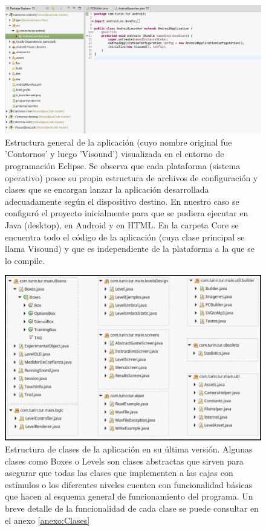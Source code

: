 \documentclass{article}
\numberwithin{figure}{section}
\begin{document}
    \begin{figure}
        \center
        \includegraphics[width=\textwidth]{Imagenes/Eclipse1.png}
        \caption{Estructura general de la aplicación (cuyo nombre original fue 'Contornos' y luego 'Visound') visualizada en el entorno de programación Eclipse. Se observa que cada plataforma (sistema operativo) posee su propia estructura de archivos de configuración y clases que se encargan lanzar la aplicación desarrollada adecuadamente según el dispositivo destino. En nuestro caso se configuró el proyecto inicialmente para que se pudiera ejecutar en Java (desktop), en Android y en HTML. En la carpeta Core se encuentra todo el código de la aplicación (cuya clase principal se llama Visound) y que es independiente de la plataforma a la que se lo compile.}
        \label{fig:Eclipse1}
    \end{figure}
    
    \begin{figure}
        \center
        \includegraphics[width=\textwidth]{Imagenes/Clases.png}
        \caption{Estructura de clases de la aplicación en su última versión. Algunas clases como Boxes o Levels son clases abstractas que sirven para asegurar que todas las clases que implementen a las cajas con estímulos o los diferentes niveles cuenten con funcionalidad básicas que hacen al esquema general de funcionamiento del programa. Un breve detalle de la funcionalidad de cada clase se puede consultar en el anexo \ref{anexo:Clases}}
        \label{fig:Clases}
    \end{figure}
    
\end{document}
